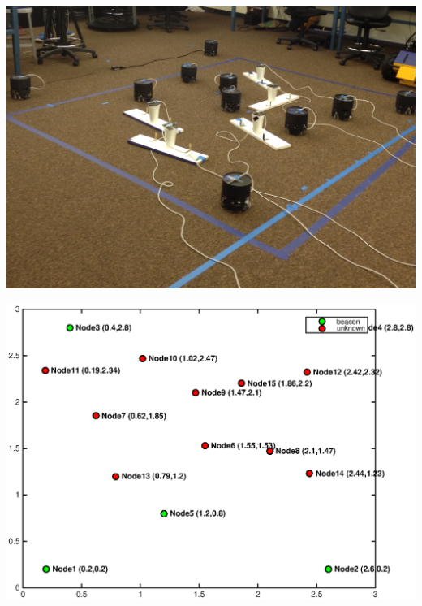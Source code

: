 \documentclass[11pt]{beamer}
\begin{document}
\begin{frame}
\includegraphics[width=\textwidth]{wolfbot_setup.jpg} 
\end{frame}

\begin{frame}
\includegraphics[width=\textwidth]{topo1.eps} 
\end{frame}
\end{document}
